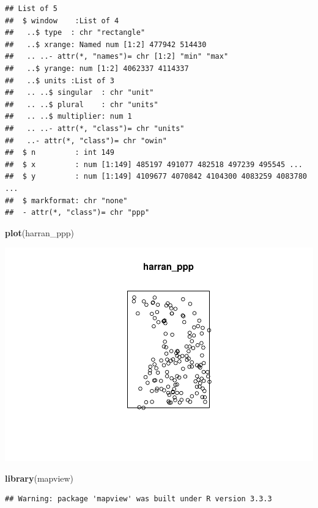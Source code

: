 \documentclass[]{article}
\newenvironment{Shaded}{\begin{snugshade}}{\end{snugshade}}
\newcommand{\KeywordTok}[1]{\textcolor[rgb]{0.13,0.29,0.53}{\textbf{{#1}}}}
\newcommand{\NormalTok}[1]{{#1}}
\begin{document}
\begin{verbatim}
## List of 5
##  $ window    :List of 4
##   ..$ type  : chr "rectangle"
##   ..$ xrange: Named num [1:2] 477942 514430
##   .. ..- attr(*, "names")= chr [1:2] "min" "max"
##   ..$ yrange: num [1:2] 4062337 4114337
##   ..$ units :List of 3
##   .. ..$ singular  : chr "unit"
##   .. ..$ plural    : chr "units"
##   .. ..$ multiplier: num 1
##   .. ..- attr(*, "class")= chr "units"
##   ..- attr(*, "class")= chr "owin"
##  $ n         : int 149
##  $ x         : num [1:149] 485197 491077 482518 497239 495545 ...
##  $ y         : num [1:149] 4109677 4070842 4104300 4083259 4083780 ...
##  $ markformat: chr "none"
##  - attr(*, "class")= chr "ppp"
\end{verbatim}

\begin{Shaded}
\begin{Highlighting}[]
\KeywordTok{plot}\NormalTok{(harran_ppp)}
\end{Highlighting}
\end{Shaded}

\includegraphics{HarranPlain_files/figure-latex/unnamed-chunk-2-1.pdf}

\begin{Shaded}
\begin{Highlighting}[]
\KeywordTok{library}\NormalTok{(mapview)}
\end{Highlighting}
\end{Shaded}

\begin{verbatim}
## Warning: package 'mapview' was built under R version 3.3.3
\end{verbatim}
\end{document}
